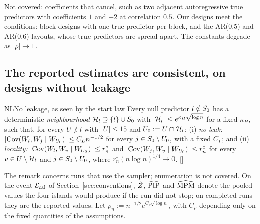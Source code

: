 Not covered: coefficients that cancel, such as two adjacent autoregressive true predictors with coefficients $1$ and $-2$
at correlation $0.5$. Our designs meet the conditions: block designs with one true predictor per block, and the AR($0.5$)
and AR($0.6$) layouts, whose true predictors are spread apart. The constants degrade as $\lvert \rho\rvert\to1$.



\subsection{The reported estimates are consistent, on designs without leakage}\label{sec:outputs}



\begin{assumption}{NL}{No leakage, as seen by the start law}
Every null predictor $l\notin S_0$ has a deterministic \emph{neighbourhood} $\mathcal H_l\supseteq\{l\}\cup S_0$ with
$\lvert \mathcal H_l\rvert\le e^{\kappa_H\sqrt{\log n}}$ for a fixed $\kappa_H$, such that, for every $U\not\ni l$ with $\lvert U\rvert\le15$ and
$U_0:=U\cap\mathcal H_l$: (i) \emph{no leak:} $\lvert \operatorname{Cov}(W_l,W_j\mid W_{U_0})\rvert\le C_Ln^{-1/2}$ for every $j\in S_0\setminus U_0$,
with a fixed $C_L$; and (ii) \emph{locality:} $\lvert \operatorname{Cov}(W_l,W_v\mid W_{U_0})\rvert\le r^\circ_n$ and
$\lvert \operatorname{Cov}(W_j,W_v\mid W_{U_0})\rvert\le r^\circ_n$ for every $v\in U\setminus\mathcal H_l$ and $j\in S_0\setminus U_0$, where
$r^\circ_n(n\log n)^{1/4}\to0$. \hfill []
\end{assumption}

The remark concerns runs that use the sampler; enumeration is not covered. On the event $\mathcal E_{\mathrm{cal}}$ of
Section~\ref{sec:conventions}, $\hat Z$, $\widehat{\mathrm{PIP}}$ and
$\widehat{\mathrm{MPM}}$ denote the pooled values the four islands would produce if the run did not stop; on completed runs they
are the reported values. Let $\rho_n:=n^{-1/2}e^{C_\rho\sqrt{\log n}}$, with $C_\rho$ depending only on the fixed quantities of the
assumptions.


